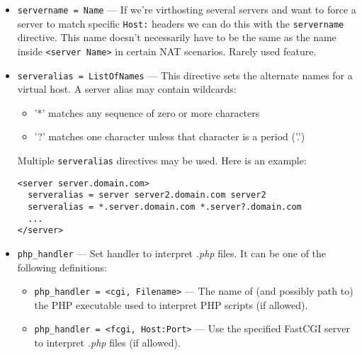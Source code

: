 \documentclass[11pt,oneside,english]{book}
\begin{document}
\begin{itemize}
\item       \verb+servername = Name+ ---
              If we're virthosting several servers and want to force a server to
              match specific \verb+Host:+ headers we can do this with the \verb+servername+
              directive. This name doesn't necessarily have to be the same as
              the name inside \verb+<server Name>+ in certain NAT scenarios. Rarely
              used feature.

\item       \verb+serveralias = ListOfNames+ ---
              This directive sets the alternate names for a virtual host. A
              server alias may contain wildcards:
              \begin{itemize}
                \item '*' matches any sequence of zero or more characters
                \item '?' matches one character unless that character is a
                  period ('.')
              \end{itemize}
              Multiple \verb+serveralias+ directives may be used. Here is an
              example:
\begin{verbatim}
<server server.domain.com>
  serveralias = server server2.domain.com server2
  serveralias = *.server.domain.com *.server?.domain.com
  ...
</server>
\end{verbatim}

\item       \verb+php_handler+ ---
              Set handler to interpret \textit{.php} files. It can be
              one of the following definitions:

              \begin{itemize}
              \item \verb+php_handler = <cgi, Filename>+ --- The name
                of (and possibly path to) the PHP executable used to
                interpret PHP scripts (if allowed).
              \item \verb+php_handler = <fcgi, Host:Port>+ --- Use the
                specified FastCGI server to interpret \textit{.php}
                files (if allowed).


\end{itemize}
\end{itemize}
\end{document}
